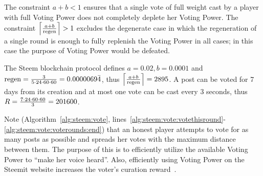 \begin{remark}
  The constraint $a + b < 1$ ensures that a single vote of full weight cast by a
  player with full Voting Power does not completely deplete her Voting Power.
  The constraint $\ceil*{\frac{a + b}{\regen}} > 1$ excludes the degenerate
  case in which the regeneration of a single round is enough to fully replenish
  the Voting Power in all cases; in this case the purpose of Voting Power would
  be defeated.
\end{remark}

\begin{remark}
  \label{remark:steemitparms}
  The Steem blockchain protocol defines $a = 0.02, b = 0.0001$ and $\regen =
  \frac{3}{5 \cdot 24 \cdot 60 \cdot 60} = 0.0000069\bar{4}$, thus
  $\ceil*{\frac{a + b}{\regen}} = 2895$. A post can be voted for 7 days from its
  creation and at most one vote can be cast every 3 seconds, thus $\rounds =
  \frac{7 \cdot 24 \cdot 60 \cdot 60}{3} = 201600$.
\end{remark}

\begin{remark}
  Note (Algorithm~\ref{alg:steem:vote},
  lines~\ref{alg:steem:vote:votethisround}-\ref{alg:steem:vote:voterounds:end})
  that an honest player attempts to vote for as many posts as possible and
  spreads her votes with the maximum distance between them. The purpose of this
  is to efficiently utilize the available Voting Power to ``make her voice
  heard''. Also, efficiently using Voting Power on the Steemit website increases
  the voter's curation reward~\cite{curationRewards}.
\end{remark}
